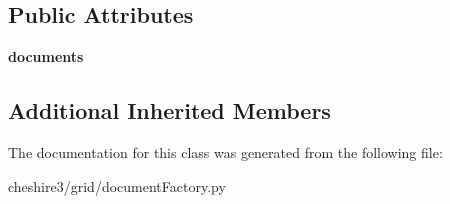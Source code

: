 \subsection*{Public Attributes}
\begin{DoxyCompactItemize}
\item 
\hypertarget{classcheshire3_1_1grid_1_1document_factory_1_1_irods_consuming_file_document_stream_acdd0d897e9e01815b078d9a0b09c294f}{{\bfseries documents}}\label{classcheshire3_1_1grid_1_1document_factory_1_1_irods_consuming_file_document_stream_acdd0d897e9e01815b078d9a0b09c294f}

\end{DoxyCompactItemize}
\subsection*{Additional Inherited Members}


The documentation for this class was generated from the following file\-:\begin{DoxyCompactItemize}
\item 
cheshire3/grid/document\-Factory.\-py\end{DoxyCompactItemize}
